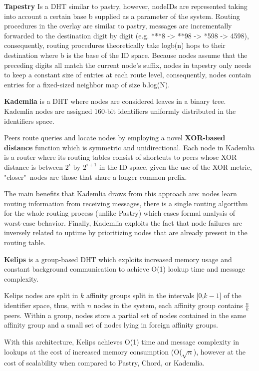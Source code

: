 \textbf{Tapestry} \cite{tapestry} Is a DHT similar to pastry, however, nodeIDs are represented taking into account a certain base b supplied as a parameter of the system. Routing procedures in the overlay are similar to pastry, messages are incrementally forwarded to the destination digit by digit (e.g. ***8 -> **98 -> *598 -> 4598), consequently, routing procedures theoretically take logb(n) hops to their destination where b is the base of the ID space. Because nodes assume that the preceding digits all match the current node's suffix, nodes in tapestry only needs to keep a constant size of entries at each route level, consequently, nodes contain entries for a fixed-sized neighbor map of size b.log(N).  

\textbf{Kademlia} \cite{maymounkov2002kademlia} is a DHT where nodes are considered leaves in a binary tree. Kademlia nodes are assigned 160-bit identifiers uniformly distributed in the identifiers space.

Peers route queries and locate nodes by employing a novel \textbf{XOR-based distance} function which is symmetric and unidirectional. Each node in Kademlia is a router where its routing tables consist of shortcuts to peers whose XOR distance is between \(2^{i}\) by \(2^{i + 1}\) in the ID space, given the use of the XOR metric, "closer"\ nodes are those that share a longer common prefix.

The main benefits that Kademlia draws from this approach are: nodes learn routing information from receiving messages, there is a single routing algorithm for the whole routing process (unlike Pastry) which eases formal analysis of worst-case behavior. Finally, Kademlia exploits the fact that node failures are inversely related to uptime by prioritizing nodes that are already present in the routing table.

\textbf{Kelips} \cite{gupta2003kelips} is a group-based DHT which exploits increased memory usage and constant background communication to achieve O(1) lookup time and message complexity. 

Kelips nodes are split in $k$ affinity groups split in the intervals [0,$k-1$] of the identifier space, thus, with $n$ nodes in the system, each affinity group contains $\frac{n}{k}$ peers. Within a group, nodes store a partial set of nodes contained in the same affinity group and a small set of nodes lying in foreign affinity groups.

With this architecture, Kelips achieves O(1) time and message complexity in lookups at the cost of increased memory consumption (O($\sqrt{n}$), however at the cost of scalability when compared to Pastry, Chord, or Kademlia. 

